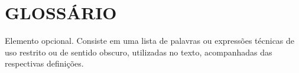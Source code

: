 \chapter*{GLOSSÁRIO}
Elemento opcional. Consiste em uma lista de palavras ou expressões técnicas de uso restrito ou de sentido obscuro, utilizadas no texto, acompanhadas das respectivas definições.